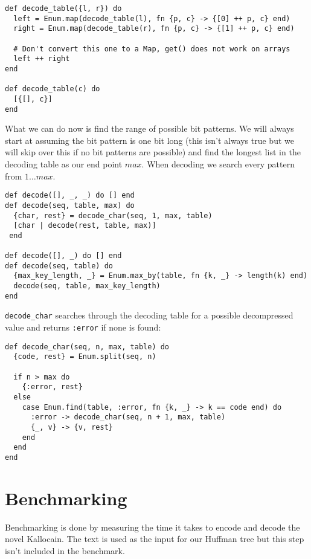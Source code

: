 \documentclass[a4paper,11pt]{article}
\begin{document}
\begin{verbatim}
def decode_table({l, r}) do
  left = Enum.map(decode_table(l), fn {p, c} -> {[0] ++ p, c} end)
  right = Enum.map(decode_table(r), fn {p, c} -> {[1] ++ p, c} end)

  # Don't convert this one to a Map, get() does not work on arrays
  left ++ right
end

def decode_table(c) do
  [{[], c}]
end
\end{verbatim}

What we can do now is find the range of possible bit patterns.
We will always start at assuming the bit pattern is one bit long (this isn't always true but we will skip over this if no bit patterns are possible)
and find the longest list in the decoding table as our end point $max$.
When decoding we search every pattern from $1 \ldots max$.

\begin{verbatim}
def decode([], _, _) do [] end
def decode(seq, table, max) do
  {char, rest} = decode_char(seq, 1, max, table)
  [char | decode(rest, table, max)]
 end

def decode([], _) do [] end
def decode(seq, table) do
  {max_key_length, _} = Enum.max_by(table, fn {k, _} -> length(k) end)
  decode(seq, table, max_key_length)
end
\end{verbatim}

\texttt{decode_char} searches through the decoding table for a possible decompressed value and returns \texttt{:error} if none is found:

\begin{verbatim}
def decode_char(seq, n, max, table) do
  {code, rest} = Enum.split(seq, n)

  if n > max do
    {:error, rest}
  else
    case Enum.find(table, :error, fn {k, _} -> k == code end) do
      :error -> decode_char(seq, n + 1, max, table)
      {_, v} -> {v, rest}
    end
  end
end
\end{verbatim}

\section*{Benchmarking}

Benchmarking is done by measuring the time it takes to encode and decode the novel Kallocain. The text is used as the input for our Huffman tree but this step isn't included in the benchmark.
\end{document}
